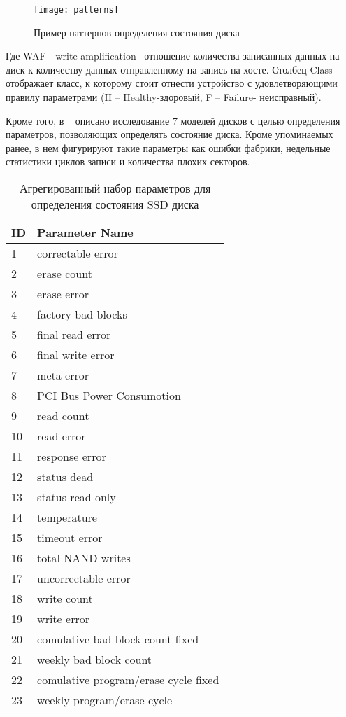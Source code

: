 \begin{figure}[h]
	\centering
	\texttt{[image: patterns]}
	\caption{Пример паттернов определения состояния диска}
	\label{fig:patterns}
\end{figure}
 

Где WAF - write amplification –отношение количества записанных данных на диск к количеству данных отправленному на запись на хосте.
Столбец Class отображает класс, к которому стоит отнести устройство с удовлетворяющими правилу параметрами (H – Healthy-здоровый, F – Failure- неисправный).

Кроме того, в  ~\cite{errorpredr} описано исследование 7 моделей дисков с целью определения параметров, позволяющих определять состояние диска. Кроме упоминаемых ранее, в нем фигурируют такие параметры как ошибки фабрики, недельные статистики циклов записи и количества плохих секторов.
\begin{table}
	\captionsetup{skip=5pt}
	\caption{Агрегированный набор параметров 
		для определения состояния SSD диска}
	\centering
	\begin{tabular}{ | l | l | }
		\hline
		ID & Parameter Name \\ \hline
		1 & correctable error  \\
		2 & erase count \\
		3 & erase error \\
		4 & factory bad blocks\\
		5 & final read error\\
		6 & final write error\\
		7 & meta error\\
		8 & PCI Bus Power Consumotion\\
		9 & read count\\
		10 & read error\\
		11 & response error\\
		12 & status dead\\
		13 & status read only\\
		14 & temperature\\
		15 & timeout error\\
		16 & total NAND writes\\
		17 & uncorrectable error\\
		18 & write count\\
		19 & write error\\
		20 & comulative bad block count fixed\\
		21 & weekly bad block count\\
		22 & comulative program/erase cycle fixed\\
		23 & weekly program/erase cycle\\
		\hline
	\end{tabular}
	\label{table:tab1}
\end{table}

